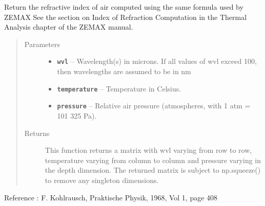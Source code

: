 \documentclass[a4paper,10pt,english]{sphinxmanual}
\begin{document}
\begin{fulllineitems}
\label{packages:optics.n_air}
Return the refractive index of air computed using the same formula used by ZEMAX
See the section on Index of Refraction Computation in the Thermal Analysis chapter of the ZEMAX manual.
\begin{quote}\begin{description}
\item[{Parameters}] \leavevmode\begin{itemize}
\item {} 
\textbf{\texttt{wvl}} -- Wavelength(s) in microns. If all values of wvl exceed 100, then wavelengths are assumed to be in nm

\item {} 
\textbf{\texttt{temperature}} -- Temperature in Celsius.

\item {} 
\textbf{\texttt{pressure}} -- Relative air pressure (atmospheres, with 1 atm = 101 325 Pa).

\end{itemize}

\item[{Returns}] \leavevmode
This function returns a matrix with wvl varying from row to row, temperature varying from column to column
and pressure varying in the depth dimension. The returned matrix is subject to np.squeeze() to remove any
singleton dimensions.

\end{description}\end{quote}

Reference :
F. Kohlrausch, Praktische Physik, 1968, Vol 1, page 408

\end{fulllineitems}

\end{document}
